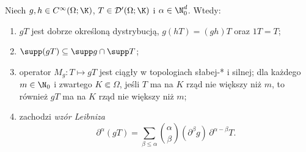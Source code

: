 \begin{twierdzenie}
\label{thm:multiply20}
Niech $g,h\in C^\infty(\Omega;\K)$, $T\in\mathcal D'(\Omega;\K)$
i $\alpha\in\N_0^d$. Wtedy:
\begin{enumerate}
\item $gT$ jest dobrze określoną dystrybucją,
$g(hT)=(gh)T$ oraz $1T=T$;
\item $\supp(gT)\subseteq\supp g\cap\supp T$;
\item operator $M_g:T\mapsto gT$ jest ciągły w topologiach
słabej-* i silnej; dla każdego $m\in\N_0$ i zwartego
$K\Subset\Omega$, jeśli $T$ ma na $K$ rząd nie większy
niż $m$, to również $gT$ ma na $K$ rząd nie większy niż $m$;
\item zachodzi \emph{wzór Leibniza}
\[
 \partial^\alpha(gT)=
 \sum_{\beta\le\alpha}\binom\alpha\beta
 (\partial^\beta g)\,\partial^{\alpha-\beta}T.
\]
\end{enumerate}
\end{twierdzenie}
